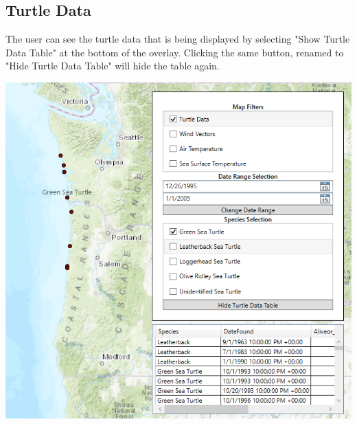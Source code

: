 \documentclass[onecolumn, draftclsnofoot,10pt, compsoc]{IEEEtran}
\begin{document}
\subsection{Turtle Data}
The user can see the turtle data that is being displayed by selecting "Show Turtle Data Table" at the bottom of the overlay. Clicking the same button, renamed to "Hide Turtle Data Table" will hide the table again. 
\newline \begin{center}\includegraphics[width=0.5 \textwidth]{images/data-table.PNG}\end{center}

\pagebreak
\end{document}
